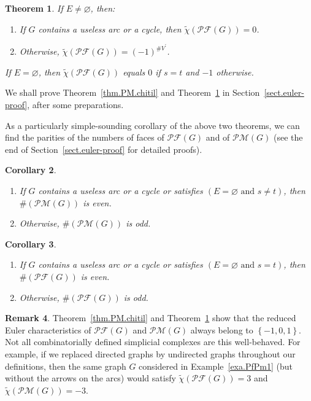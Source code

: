 \documentclass[12pt]{amsart}
\newtheorem{theorem}{Theorem}[section]
\newtheorem{corollary}[theorem]{Corollary}
\theoremstyle{definition}
\newtheorem{remark}[theorem]{Remark}
\newcommand{\set}[1]{\left\{ #1 \right\}}
\newcommand{\tup}[1]{\left( #1 \right)}
\newcommand{\chitil}{\widetilde{\chi}}
\newcommand{\Pm}[1]{\mathcal{PM}\left(#1\right)}
\newcommand{\Pf}[1]{\mathcal{PF}\left(#1\right)}
\newcommand{\NS}{V^{\prime}}
\begin{document}
\begin{theorem}
\label{thm.PF.chitil}
If $E \neq \varnothing$, then:
\begin{enumerate}
    \item[(a)] If $G$ contains a useless arc or a cycle, then $\chitil\tup{\Pf{G}} = 0$.
    \item[(b)] Otherwise, $\chitil\tup{\Pf{G}} = \tup{-1}^{\# \NS}$.
\end{enumerate}
If $E = \varnothing$, then $\chitil\tup{\Pf{G}}$ equals $0$ if $s = t$ and $-1$ otherwise.
\end{theorem}

We shall prove Theorem~\ref{thm.PM.chitil} and Theorem~\ref{thm.PF.chitil} in Section~\ref{sect.euler-proof}, after some preparations.

As a particularly simple-sounding corollary of the above two theorems, we can find the parities of the numbers of faces of $\Pf{G}$ and of $\Pm{G}$ (see the end of Section~\ref{sect.euler-proof} for detailed proofs).

\begin{corollary}
\label{cor.PM.parity} \hfill
\begin{enumerate}
    \item[(a)] If $G$ contains a useless arc or a cycle or satisfies $\tup{E = \varnothing \text{ and } s \neq t}$, then $\# \tup{\Pm{G}}$ is even.
    \item[(b)] Otherwise, $\# \tup{\Pm{G}}$ is odd.
\end{enumerate}
\end{corollary}

\begin{corollary}
\label{cor.PF.parity} \hfill
\begin{enumerate}
    \item[(a)] If $G$ contains a useless arc or a cycle or satisfies $\tup{E = \varnothing \text{ and } s = t}$, then $\# \tup{\Pf{G}}$ is even.
    \item[(b)] Otherwise, $\# \tup{\Pf{G}}$ is odd.
\end{enumerate}
\end{corollary}

\begin{remark}
Theorem~\ref{thm.PM.chitil} and Theorem~\ref{thm.PF.chitil}
show that the reduced Euler characteristics of $\Pf{G}$ and
$\Pm{G}$ always belong to $\set{-1, 0, 1}$.
Not all combinatorially defined simplicial complexes are
this well-behaved.
For example, if we replaced directed graphs by
undirected graphs throughout our definitions,
then the same graph $G$ considered in Example~\ref{exa.PfPm1}
(but without the arrows on the arcs)
would satisfy $\chitil\tup{\Pf{G}} = 3$ and
$\chitil\tup{\Pm{G}} = -3$.
\end{remark}
\end{document}
